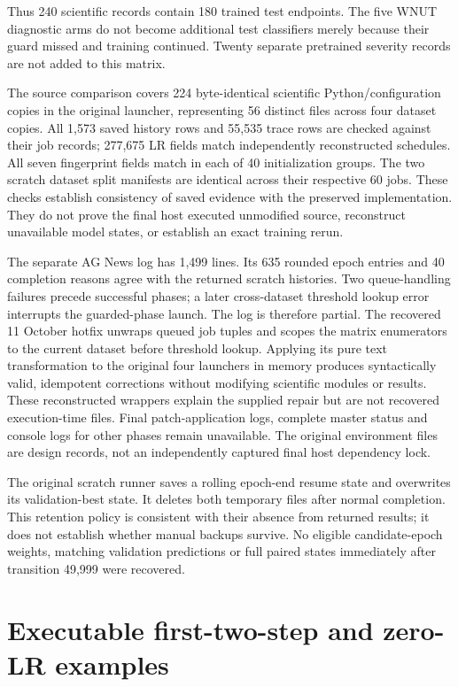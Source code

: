 \documentclass[11pt,a4paper]{article}
\begin{document}
Thus 240 scientific records contain 180 trained test endpoints. The five WNUT diagnostic arms do not become additional test classifiers merely because their guard missed and training continued. Twenty separate pretrained severity records are not added to this matrix.

The source comparison covers 224 byte-identical scientific Python/configuration copies in the original launcher, representing 56 distinct files across four dataset copies. All 1,573 saved history rows and 55,535 trace rows are checked against their job records; 277,675 LR fields match independently reconstructed schedules. All seven fingerprint fields match in each of 40 initialization groups. The two scratch dataset split manifests are identical across their respective 60 jobs. These checks establish consistency of saved evidence with the preserved implementation. They do not prove the final host executed unmodified source, reconstruct unavailable model states, or establish an exact training rerun.

The separate AG News log has 1,499 lines. Its 635 rounded epoch entries and 40 completion reasons agree with the returned scratch histories. Two queue-handling failures precede successful phases; a later cross-dataset threshold lookup error interrupts the guarded-phase launch. The log is therefore partial. The recovered 11 October hotfix unwraps queued job tuples and scopes the matrix enumerators to the current dataset before threshold lookup. Applying its pure text transformation to the original four launchers in memory produces syntactically valid, idempotent corrections without modifying scientific modules or results. These reconstructed wrappers explain the supplied repair but are not recovered execution-time files. Final patch-application logs, complete master status and console logs for other phases remain unavailable. The original environment files are design records, not an independently captured final host dependency lock.

The original scratch runner saves a rolling epoch-end resume state and overwrites its validation-best state. It deletes both temporary files after normal completion. This retention policy is consistent with their absence from returned results; it does not establish whether manual backups survive. No eligible candidate-epoch weights, matching validation predictions or full paired states immediately after transition 49,999 were recovered.

\section{Executable first-two-step and zero-LR examples}\label{executable-first-two-step-and-zero-lr-examples}
\end{document}
